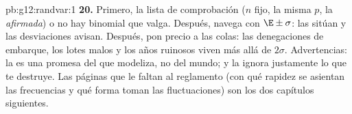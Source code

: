 \begin{solution}{pb:g12:randvar:1}
\textbf{20.} Primero, la lista de comprobación ($n$ fijo, la misma $p$, la
 \emph{afirmada}) o no hay binomial que valga. Después, navega
con $\E \pm \sigma$: las  sitúan y las desviaciones avisan. Después,
pon precio a las colas: las denegaciones de embarque, los lotes malos y los
años ruinosos viven más allá de $2\sigma$. Advertencias: la 
es una promesa del que modeliza, no del mundo; y la  ignora
justamente lo que te destruye. Las páginas que le faltan al reglamento
(con qué rapidez se asientan las frecuencias y qué forma toman las
fluctuaciones) son los dos capítulos siguientes.
\end{solution}
